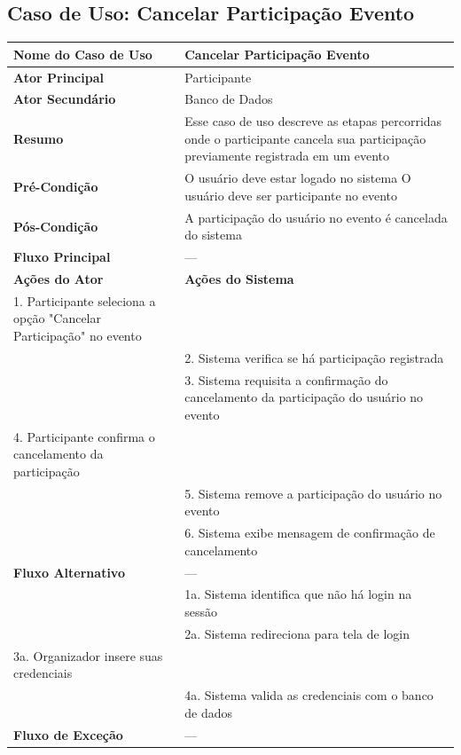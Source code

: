 \documentclass[12pt,a4paper]{article}
\begin{document}
\vspace{1cm}

\subsection{Caso de Uso: Cancelar Participação Evento}
\begin{longtable}{|p{4cm}|p{11cm}|}
\hline
\textbf{Nome do Caso de Uso} & Cancelar Participação Evento \\ \hline
\textbf{Ator Principal} & Participante \\ \hline
\textbf{Ator Secundário} & Banco de Dados \\ \hline
\textbf{Resumo} & Esse caso de uso descreve as etapas percorridas onde o participante cancela sua participação previamente registrada em um evento \\ \hline
\textbf{Pré-Condição} & O usuário deve estar logado no sistema \newline O usuário deve ser participante no evento \\ \hline
\textbf{Pós-Condição} & A participação do usuário no evento é cancelada do sistema \\ \hline
\textbf{Fluxo Principal} & --- \\ \hline
\textbf{Ações do Ator} & \textbf{Ações do Sistema} \\ \hline
1. Participante seleciona a opção "Cancelar Participação" no evento & \\ \hline
& 2. Sistema verifica se há participação registrada \\ \hline
& 3. Sistema requisita a confirmação do cancelamento da participação do usuário no evento \\ \hline
4. Participante confirma o cancelamento da participação & \\ \hline
& 5. Sistema remove a participação do usuário no evento \\ \hline
& 6. Sistema exibe mensagem de confirmação de cancelamento \\ \hline
\textbf{Fluxo Alternativo} & --- \\ \hline
& 1a. Sistema identifica que não há login na sessão \\ \hline
& 2a. Sistema redireciona para tela de login \\ \hline
3a. Organizador insere suas credenciais & \\ \hline
& 4a. Sistema valida as credenciais com o banco de dados \\ \hline
\textbf{Fluxo de Exceção} & --- \\ \hline

\end{longtable}
\end{document}
